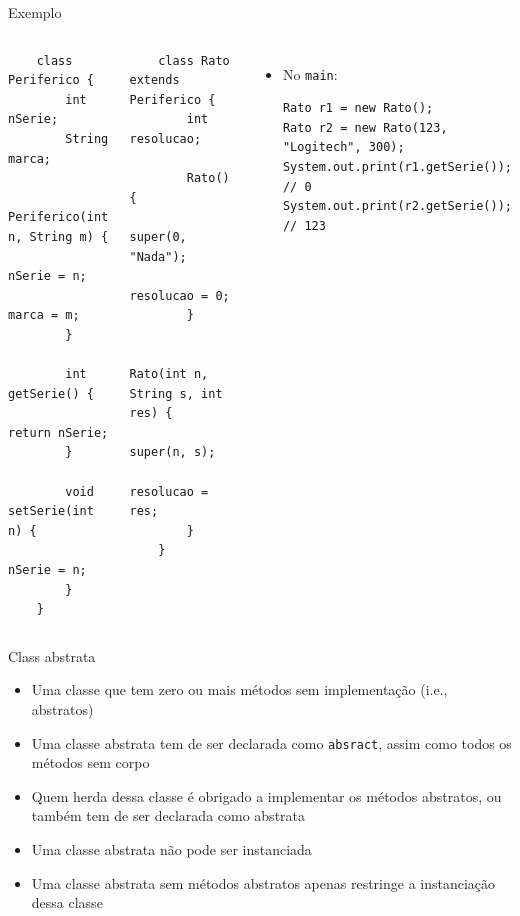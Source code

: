 \documentclass[portuguese, aspectratio=169, xcolor=table]{beamer}
\begin{document}
\begin{frame}[fragile]{Exemplo}
    \begin{columns}  
        \scriptsize
\begin{verbatim}
    class Periferico {
        int nSerie;
        String marca;
        
        Periferico(int n, String m) {
            nSerie = n;
            marca = m;
        }
    
        int getSerie() {
            return nSerie;
        }
    
        void setSerie(int n) {
            nSerie = n;
        }
    }
\end{verbatim}
        \scriptsize
\begin{verbatim}   
    class Rato extends Periferico {
        int resolucao;
        
        Rato() {
            super(0, "Nada");
            resolucao = 0;
        }
        
        Rato(int n, String s, int res) {
            super(n, s);
            resolucao = res;
        }
    }
    \end{verbatim}
\begin{itemize}
    \item No \texttt{main}:
\begin{verbatim}
Rato r1 = new Rato();
Rato r2 = new Rato(123, "Logitech", 300);
System.out.print(r1.getSerie());  // 0
System.out.print(r2.getSerie());  // 123
\end{verbatim}
\end{itemize}
\end{columns}
\end{frame}


\begin{frame}{Class abstrata}
\begin{itemize}
    \item Uma classe que tem zero ou mais métodos sem implementação (i.e., abstratos)
    \item Uma classe abstrata tem de ser declarada como \texttt{absract}, assim como todos os métodos sem corpo
    \item Quem herda dessa classe é obrigado a implementar os métodos abstratos, ou também tem de ser declarada como abstrata
    \item Uma classe abstrata não pode ser instanciada
    
    \item Uma classe abstrata sem métodos abstratos apenas restringe a instanciação dessa classe
\end{itemize}
\end{frame}
\end{document}

